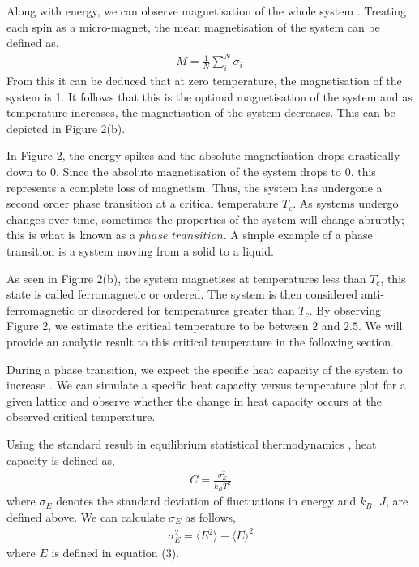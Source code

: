 \documentclass[a4paper]{article}
\begin{document}
Along with energy, we can observe magnetisation of the whole system \cite{2}\cite{8}. Treating each spin as a micro-magnet, the mean magnetisation of the system can be defined as,
\begin{align*}
M = \frac{1}{N}\sum_{i}^{N} \sigma_{i} \
\end{align*}
From this it can be deduced that at zero temperature, the magnetisation of the system is 1. It follows that this is the optimal magnetisation of the system and as temperature increases, the magnetisation of the system decreases. This can be depicted in Figure 2(b).

In Figure 2, the energy spikes and the absolute magnetisation drops drastically down to 0. Since the absolute magnetisation of the system drops to 0, this represents a complete loss of magnetism. Thus, the system has undergone a second order phase transition at a critical temperature $T_{c}$. As systems undergo changes over time, sometimes the properties of the system will change abruptly; this is what is known as a $phase$ $transition$. A simple example of a phase transition is a system moving from a solid to a liquid.

As seen in Figure 2(b), the system magnetises at temperatures less than $T_{c}$, this state is called ferromagnetic or ordered. The system is then considered anti-ferromagnetic or disordered for temperatures greater than $T_{c}$. By observing Figure 2, we estimate the critical temperature to be between $2$ and $2.5$. We will provide an analytic result to this critical temperature in the following section.

During a phase transition, we expect the specific heat capacity of the system to increase \cite{8}. We can simulate a specific heat capacity versus temperature plot for a given lattice and observe whether the change in heat capacity occurs at the observed critical temperature.

Using the standard result in equilibrium statistical thermodynamics \cite{7}, heat capacity is defined as,
\begin{align*}
C = \frac{\sigma_{E}^2}{k_{B}T^2}
\end{align*}
where $\sigma_{E}$ denotes the standard deviation of fluctuations in energy and $k_{B}$, $J$, are defined above. We can calculate $\sigma_{E}$ as follows, 
\begin{align*}
\sigma_{E}^2 =  {\langle E^2\rangle} - {\langle E\rangle ^2}
\end{align*}
 where $E$ is defined in equation (3).
 
\end{document}
